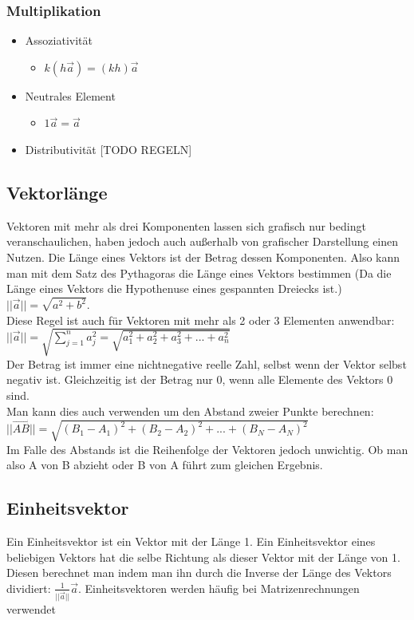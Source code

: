 \documentclass{article}
\begin{document}
	\subsubsection{Multiplikation}
	\begin{itemize}
		\item{Assoziativität}
		\begin{itemize}
			\item{$k(h \vec{a})=(kh)\vec{a}$}
		\end{itemize}
		\item{Neutrales Element}
		\begin{itemize}
			\item{$1 \vec{a}=\vec{a}$}
		\end{itemize}
		\item{Distributivität}
		[TODO REGELN]
	\end{itemize}
	\subsection{Vektorlänge}
	Vektoren mit mehr als drei Komponenten lassen sich grafisch nur bedingt veranschaulichen, haben jedoch auch außerhalb von grafischer Darstellung einen Nutzen. Die Länge eines Vektors ist der Betrag dessen Komponenten. Also kann man mit dem Satz des Pythagoras die Länge eines Vektors bestimmen (Da die Länge eines Vektors die Hypothenuse eines gespannten Dreiecks ist.) $||\vec{a}||=\sqrt{a^2+b^2}$. \\
	Diese Regel ist auch für Vektoren mit mehr als 2 oder 3 Elementen anwendbar: $||\vec{a}||=\sqrt{\sum_{j=1}^{n}a_j^2=\sqrt{a_1^2+a_2^2+a_3^2+...+a_n^2}}$ \\
	Der Betrag ist immer eine nichtnegative reelle Zahl, selbst wenn der Vektor selbst negativ ist. Gleichzeitig ist der Betrag nur 0, wenn alle Elemente des Vektors 0 sind. \\
	Man kann dies auch verwenden um den Abstand zweier Punkte berechnen: $||\overrightarrow{AB}||=\sqrt{(B_1-A_1)^2+(B_2-A_2)^2+...+(B_N-A_N)^2}$ \\
	Im Falle des Abstands ist die Reihenfolge der Vektoren jedoch unwichtig. Ob man also A von B abzieht oder B von A führt zum gleichen Ergebnis.
	\subsection{Einheitsvektor}
	Ein Einheitsvektor ist ein Vektor mit der Länge 1. Ein Einheitsvektor eines beliebigen Vektors hat die selbe Richtung als dieser Vektor mit der Länge von 1. Diesen berechnet man indem man ihn durch die Inverse der Länge des Vektors dividiert: ${\frac{1}{||\vec{a}||}\vec{a}}$. Einheitsvektoren werden häufig bei Matrizenrechnungen verwendet
\end{document}
